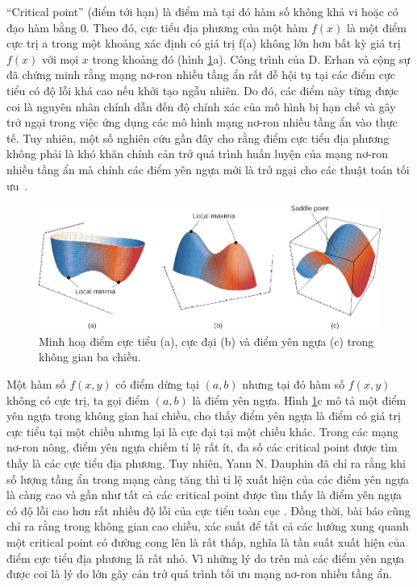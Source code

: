 ``Critical point'' (điểm tới hạn) là điểm mà tại đó hàm số không khả vi hoặc có đạo hàm bằng 0. Theo đó, cực tiểu địa phương của một hàm $f(x)$ là một điểm cực trị a trong một khoảng xác định có giá trị f(a) không lớn hơn bất kỳ giá trị $f(x)$ với mọi $x$ trong khoảng đó (hình \ref{fig:minimas}a). Công trình của D. Erhan và cộng sự \cite{erhan2009thedifficulty} đã chứng minh rằng mạng nơ-ron nhiều tầng ẩn rất dễ hội tụ tại các điểm cực tiểu có độ lỗi khá cao nếu khởi tạo ngẫu nhiên. Do đó, các điểm này từng được coi là nguyên nhân chính dẫn đến độ chính xác của mô hình bị hạn chế \cite{bengio2007scaling} và gây trở ngại trong việc ứng dụng các mô hình mạng nơ-ron nhiều tầng ẩn vào thực tế. Tuy nhiên, một số nghiên cứu gần đây cho rằng điểm cực tiểu địa phương không phải là khó khăn chính cản trở quá trình huấn luyện của mạng nơ-ron nhiều tầng ẩn mà chính các điểm yên ngựa mới là trở ngại cho các thuật toán tối ưu~\cite{dauphin2014identifying}.

\begin{figure}[htp]
	\centering
	\includegraphics[width=140 mm]{images/minimas.png}
	\caption{Minh hoạ điểm cực tiểu (a), cực đại (b) và điểm yên ngựa (c) trong không gian ba chiều.}
	\label{fig:minimas}
\end{figure}

Một hàm số $f(x,y)$ có điểm dừng tại $(a,b)$ nhưng tại đó hàm số $f(x,y)$ không có cực trị, ta gọi điểm $(a,b)$ là điểm yên ngựa. Hình \ref{fig:minimas}c mô tả một điểm yên ngựa trong không gian hai chiều, cho thấy điểm yên ngựa là điểm có giá trị cực tiểu tại một chiều nhưng lại là cực đại tại một chiều khác. Trong các mạng nơ-ron nông, điểm yên ngựa chiếm tỉ lệ rất ít, đa số các critical point được tìm thấy là các cực tiểu địa phương. Tuy nhiên, Yann N. Dauphin đã chỉ ra rằng khi số lượng tầng ẩn trong mạng càng tăng thì tỉ lệ xuất hiện của các điểm yên ngựa là càng cao và gần như tất cả các critical point được tìm thấy là điểm yên ngựa có độ lỗi cao hơn rất nhiều độ lỗi của cực tiểu toàn cục \cite{dauphin2014identifying}. Đồng thời, bài báo cũng chỉ ra rằng trong không gian cao chiều, xác suất để tất cả các hướng xung quanh một critical point có đường cong lên là rất thấp, nghĩa là tần suất xuất hiện của điểm cực tiểu địa phương là rất nhỏ. Vì những lý do trên mà các điểm yên ngựa được coi là lý do lớn gây cản trở quá trình tối ưu mạng nơ-ron nhiều tầng ẩn.

